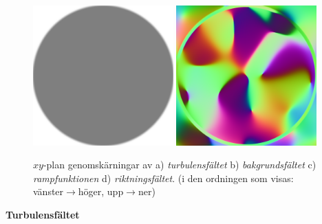 \documentclass[a4paper]{article}
\begin{document}
\begin{multicols}{2}
\begin{figure}[H]
\begin{minipage}[]{0.5\textwidth}
\vspace{0.1cm}

\includegraphics[width=0.48\textwidth]{share/Alpha_downscale.png}
\includegraphics[width=0.48\textwidth]{share/Curl_downscale.png}
\end{minipage}
    \caption{$xy$-plan genomskärningar av  a) \emph{turbulensfältet} b) \emph{bakgrundsfältet} c) \emph{rampfunktionen} d) \emph{riktningsfältet}. (i den ordningen som visas: vänster$\rightarrow$höger, upp$\rightarrow$ner)}
\label{fig:curlnoise}
\end{figure}

\vspace{-0.3cm}
    \textbf{Turbulensfältet}


\end{multicols}
\end{document}
